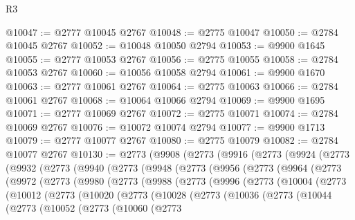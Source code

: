 \begin{lexlean}{R3}
\begin{coremodule}
@10047 := @2777 @10045 @2767
@10048 := @2775 @10047
@10050 := @2784 @10045 @2767
@10052 := @10048 @10050 @2794
@10053 := @9900 @1645
@10055 := @2777 @10053 @2767
@10056 := @2775 @10055
@10058 := @2784 @10053 @2767
@10060 := @10056 @10058 @2794
@10061 := @9900 @1670
@10063 := @2777 @10061 @2767
@10064 := @2775 @10063
@10066 := @2784 @10061 @2767
@10068 := @10064 @10066 @2794
@10069 := @9900 @1695
@10071 := @2777 @10069 @2767
@10072 := @2775 @10071
@10074 := @2784 @10069 @2767
@10076 := @10072 @10074 @2794
@10077 := @9900 @1713
@10079 := @2777 @10077 @2767
@10080 := @2775 @10079
@10082 := @2784 @10077 @2767
@10130 := @2773
    (@9908
      (@2773
        (@9916
          (@2773
            (@9924
              (@2773
                (@9932
                  (@2773
                    (@9940
                      (@2773
                        (@9948
                          (@2773
                            (@9956
                              (@2773
                                (@9964
                                  (@2773
                                    (@9972
                                      (@2773
                                        (@9980
                                          (@2773
                                            (@9988
                                              (@2773
                                                (@9996
                                                  (@2773
                                                    (@10004
                                                      (@2773
                                                        (@10012
                                                          (@2773
                                                            (@10020
                                                              (@2773
                                                                (@10028
                                                                  (@2773
                                                                    (@10036
                                                                      (@2773
                                                                        (@10044
                                                                          (@2773
                                                                            (@10052
                                                                              (@2773
                                                                                (@10060
                                                                                  (@2773

\end{coremodule}
\end{lexlean}
